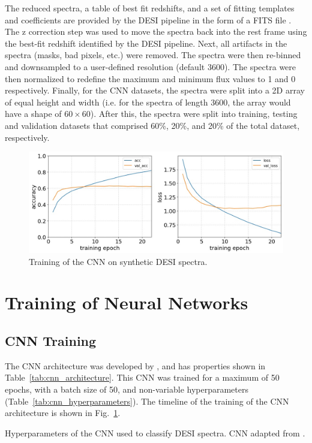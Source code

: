The reduced spectra, a table of best fit redshifts, and a set of fitting templates and 
coefficients are provided by the DESI pipeline in the form of a FITS file \parencite{Pence2010, Guy2023}.
The z correction step was used to move the spectra back into the rest frame using 
the best-fit redshift identified by the DESI pipeline. Next, all artifacts 
in the spectra (masks, bad pixels, etc.) were removed. The spectra were then re-binned
and downsampled to a user-defined resolution (default 3600). The spectra were then
normalized to redefine the maximum and minimum flux values to 1 and 0 respectively. Finally, for the 
CNN datasets, the spectra were split into a 2D array of equal height and width 
(i.e. for the spectra of length 3600, the array would have a shape of $60\times60$). 
After this, the spectra were split into training, testing and validation datasets that 
comprised 60\%, 20\%, and 20\% of the total dataset, respectively.
\begin{figure}[t]
    \centering
    \includegraphics[width=.7\linewidth]{figures/cnn/cnn_training_history.jpg}
    \caption{Training of the CNN on synthetic DESI spectra.}
    \label{fig:cnn_training}
\end{figure}
\section{Training of Neural Networks}
\label{sec:training} 

\subsection{CNN Training}
\label{ssec:cnn_training}
The CNN architecture was developed by \textcite{Sepeku2022}, and has properties 
shown in Table~\ref{tab:cnn_architecture}.
This CNN was trained for a maximum of 50 epochs, with a batch size of 50, and 
non-variable hyperparameters (Table~\ref{tab:cnn_hyperparameters}). 
The timeline of the training of the CNN architecture is shown in Fig.~\ref{fig:cnn_training}.


\begin{table}[b]
    \small
    \centering
    \sffamily
    
    \caption{Hyperparameters of the CNN used to classify DESI spectra. CNN adapted 
    from \textcite{Sepeku2022}.}
    \label{tab:cnn_hyperparameters}
\end{table}

